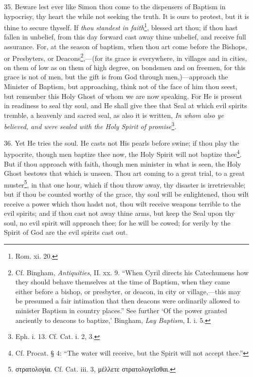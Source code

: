 35. Beware lest ever like Simon thou come to the dispensers of Baptism in hypocrisy, thy heart the while not seeking the truth. It is ours to protest, but it is thine to secure thyself. If \emph{thou standest in faith}\footnote{Rom. xi. 20.}, blessed art thou; if thou hast fallen in unbelief, from this day forward cast away thine unbelief, and receive full assurance. For, at the season of baptism, when thou art come before the Bishops, or Presbyters, or Deacons\footnote{Cf. Bingham, \emph{Antiquities}, II. xx. 9. “When Cyril directs his Catechumens how they should behave themselves at the time of Baptism, when they came either before a bishop, or presbyter, or deacon, in city or village,—this may be presumed a fair intimation that then deacons were ordinarily allowed to minister Baptism in country places.” See further ‘Of the power granted anciently to deacons to baptize,’ Bingham, \emph{Lay Baptism}, I. i. 5.},—(for its grace is everywhere, in villages and in cities, on them of low as on them of high degree, on bondsmen and on freemen, for this grace is not of men, but the gift is from God through men,)—approach the Minister of Baptism, but approaching, think not of the face of him thou seest, but remember this Holy Ghost of whom we are now speaking. For He is present in readiness to seal thy soul, and He shall give thee that Seal at which evil spirits tremble, a heavenly and sacred seal, as also it is written, \emph{In whom also ye believed, and were sealed with the Holy Spirit of promise}\footnote{Eph. i. 13. Cf. Cat. i. 2, 3.}.

36. Yet He tries the soul. He casts not His pearls before swine; if thou play the hypocrite, though men baptize thee now, the Holy Spirit will not baptize thee\footnote{Cf. Procat. § 4: “The water will receive, but the Spirit will not accept thee.”}. But if thou approach with faith, though men minister in what is seen, the Holy Ghost bestows that which is unseen. Thou art coming to a great trial, to a great muster\footnote{\textgreek{στρατολογία}. Cf. Cat. iii. 3, \textgreek{μέλλετε στρατολογεῖσθαι}.}, in that one hour, which if thou throw away, thy disaster is irretrievable; but if thou be counted worthy of the grace, thy soul will be enlightened, thou wilt receive a power which thou hadst not, thou wilt receive weapons terrible to the evil spirits; and if thou cast not away thine arms, but keep the Seal upon thy soul, no evil spirit will approach thee; for he will be cowed; for verily by the Spirit of God are the evil spirits cast out.

